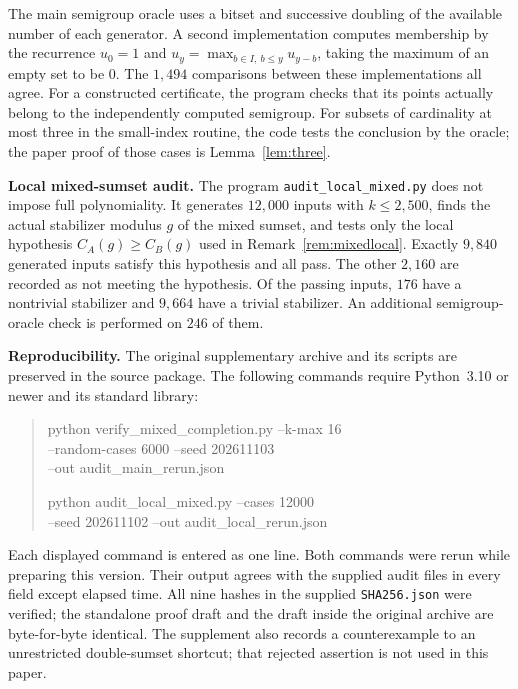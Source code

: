 \documentclass[11pt,a4paper]{article}
\numberwithin{equation}{section}
\theoremstyle{remark}
\newcommand{\code}[1]{\texttt{\small #1}}
\begin{document}
The main semigroup oracle uses a bitset and successive doubling of the
available number of each generator.
A second implementation computes membership by the recurrence
$u_0=1$ and
$u_y=\max_{b\in I,\ b\le y}u_{y-b}$, taking the maximum of an empty
set to be $0$. The $1{,}494$ comparisons between these implementations
all agree.
For a constructed certificate, the program checks that its points
actually belong to the independently computed semigroup.
For subsets of cardinality at most three in the small-index routine,
the code tests the conclusion by the oracle; the paper proof of those
cases is Lemma~\ref{lem:three}.

\textbf{Local mixed-sumset audit.}
The program \code{audit\_local\_mixed.py} does not impose full
polynomiality. It generates $12{,}000$ inputs with $k\le2{,}500$,
finds the actual stabilizer modulus $g$ of the mixed sumset, and tests
only the local hypothesis $C_A(g)\ge C_B(g)$ used in
Remark~\ref{rem:mixedlocal}.
Exactly $9{,}840$ generated inputs satisfy this hypothesis and all pass.
The other $2{,}160$ are recorded as not meeting the hypothesis.
Of the passing inputs, $176$ have a nontrivial stabilizer and
$9{,}664$ have a trivial stabilizer.
An additional semigroup-oracle check is performed on $246$ of them.

\newpage
\textbf{Reproducibility.}
The original supplementary archive and its scripts are preserved in
the source package. The following commands require Python~3.10 or
newer and its standard library:
\begin{quote}
\small\ttfamily
python verify\_mixed\_completion.py --k-max 16\\
\hspace*{1em}--random-cases 6000 --seed 202611103\\
\hspace*{1em}--out audit\_main\_rerun.json

python audit\_local\_mixed.py --cases 12000\\
\hspace*{1em}--seed 202611102 --out audit\_local\_rerun.json
\end{quote}
Each displayed command is entered as one line.
Both commands were rerun while preparing this version.
Their output agrees with the supplied audit files in every field
except elapsed time.
All nine hashes in the supplied \code{SHA256.json} were verified;
the standalone proof draft and the draft inside the original archive
are byte-for-byte identical.
The supplement also records a counterexample to an unrestricted
double-sumset shortcut; that rejected assertion is not used in this paper.
\end{document}
